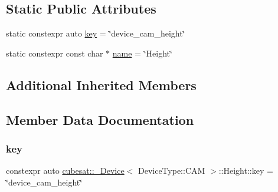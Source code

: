 \subsection*{Static Public Attributes}
\begin{DoxyCompactItemize}
\item 
static constexpr auto \hyperlink{structcubesat_1_1__Device_3_01DeviceType_1_1CAM_01_4_1_1Height_afca6045ab573c087a70f9567caea541b}{key} = \char`\"{}device\+\_\+cam\+\_\+height\char`\"{}
\item 
static constexpr const char $\ast$ \hyperlink{structcubesat_1_1__Device_3_01DeviceType_1_1CAM_01_4_1_1Height_abfa7ac84248ba625a090f256f5590a98}{name} = \char`\"{}Height\char`\"{}
\end{DoxyCompactItemize}
\subsection*{Additional Inherited Members}


\subsection{Member Data Documentation}
\mbox{\label{structcubesat_1_1__Device_3_01DeviceType_1_1CAM_01_4_1_1Height_afca6045ab573c087a70f9567caea541b}} 
\subsubsection{\texorpdfstring{key}{key}}
{\footnotesize\ttfamily constexpr auto \hyperlink{structcubesat_1_1__Device}{cubesat\+::\+\_\+\+Device}$<$ Device\+Type\+::\+C\+AM $>$\+::Height\+::key = \char`\"{}device\+\_\+cam\+\_\+height\char`\"{}\hspace{0.3cm}{\ttfamily [static]}}

\mbox{\label{structcubesat_1_1__Device_3_01DeviceType_1_1CAM_01_4_1_1Height_abfa7ac84248ba625a090f256f5590a98}} 
